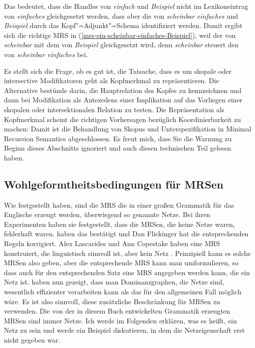 \noindent
Das bedeutet, dass die Handles von \emph{einfach} und \emph{Beispiel} nicht im
Lexikoneintrag von \emph{einfaches} gleichgesetzt werden, dass aber die \ltopwe von \emph{scheinbar
  einfaches} und \emph{Beispiel} durch das Kopf"=Adjunkt"=Schema identifiziert werden. Damit ergibt
sich die richtige MRS in (\ref{mrs-ein-scheinbar-einfaches-Beispiel}), weil der \ltopw von
\emph{scheinbar} mit dem von \emph{Beispiel} gleichgesetzt wird, denn \emph{scheinbar} steuert
den \ltopw von \emph{scheinbar einfaches} bei.

Es stellt sich die Frage, ob es gut ist, die Tatsache, dass es um skopale oder intersective
Modifikatoren geht als Kopfmerkmal zu repräsentieren. Die Alternative bestünde darin, die
Hauptrelation des Kopfes zu kennzeichnen und dann bei Modifikation als Antezedens einer Implikation
auf das Vorliegen einer skopalen oder intersektionalen Relation zu testen. Die Repräsentation als
Kopfmerkmal scheint die richtigen Vorhersagen bezüglich Koordinierbarkeit zu machen:
\eal
{}
\zl
Damit ist die Behandlung von Skopus und Unterspezifikation in Minimal Recursion Semantics abgeschlossen. Es freut mich, dass Sie
die Warnung zu Beginn dieses Abschnitts ignoriert und auch diesen technischen Teil gelesen haben.

\subsection{Wohlgeformtheitsbedingungen für MRSen}
\label{sec-Wohlgeformtheitsbedingungen für MRSen}
\label{Abschnitt-Semantik-possessive-Relativpronomina}

Wie \citet*{FucKolNieTha2004a} festgestellt haben, sind die MRS die in einer großen Grammatik für
das Englische \citep{CF2000a-u} erzeugt werden, überwiegend so genannte Netze. Bei ihren
Experimenten haben sie festgestellt, dass die MRSen, die keine Netze waren, fehlerhaft
waren. \citet*{FKT2005a} haben das bestätigt und Dan Flickinger hat die entsprechenden Regeln
korrigiert. Alex Lascarides und Ann Copestake haben eine MRS konstruiert, die linguistisch sinnvoll ist, aber
kein Netz \citep[Abschnitt~4.3]{FKT2005a}. Prinzipiell kann es solche MRSen also geben, aber die entsprechende MRS kann man
umformulieren, so dass auch für den entsprechenden Satz eine MRS angegeben werden kann, die ein Netz
ist. \citet{ADKMNT2003a} haben nun gezeigt, dass man Dominanzgraphen, die Netze sind, wesentlich effizienter
verarbeiten kann als das für den allgemeinen Fall möglich wäre. Es ist also sinnvoll, diese
zusätzliche Beschränkung für MRSen zu verwenden. Die von der in diesem Buch entwickelten Grammatik
erzeugten MRSen sind immer Netze. Ich werde im Folgenden erklären, was es heißt, ein Netz zu sein
und werde ein Beispiel diskutieren, in dem die Netzeigenschaft erst nicht gegeben war. 

